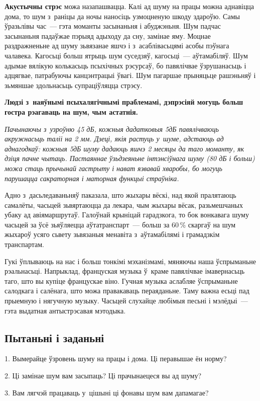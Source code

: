 \textbf{Акустычны стрэс} можа назапашвацца. Калі ад шуму на працы можна аднавіцца дома, то шум з~раніцы да ночы наносіць узмоцненую шкоду здароўю. Самы ўразьлівы час~--- гэта моманты засынаньня і абуджэньня. Шум падчас засынаньня падаўжае пэрыяд адыходу да сну, замінае яму. Моцнае раздражненьне ад шуму зьвязанае яшчэ і з~асаблівасьцямі асобы пэўнага чалавека. Кагосьці больш ятрыць шум суседзяў, кагосьці~--- аўтамабіляў. Шум адымае вялікую колькасьць псыхічных рэсурсаў, бо павялічвае ўзрушанасьць і адцягвае, патрабуючы канцэнтрацыі ўвагі. Шум пагаршае прыняцьце рашэньняў і зьмяншае здольнасьць супраціўляцца стрэсу.

\textbf{Людзі з~наяўнымі псыхалягічнымі праблемамі, дэпрэсіяй могуць больш гостра рэагаваць на шум, чым астатнія.}

\emph{Пачынаючы з~узроўню 45 дБ, кожныя дадатковыя 5дБ павялічваюць акружнасьць таліі на 2 мм. Дзеці, якія растуць у~шуме, адстаюць ад аднагодкаў: кожныя 5дБ шуму дадаюць яшчэ 2 месяцы да таго моманту, як дзіця пачне чытаць. Пастаяннае ўзьдзеяньне інтэнсіўнага шуму (80 дБ і больш) можа стаць прычынай гастрыту і нават язвавай хваробы, бо могуць парушацца сакраторная і маторная функцыі страўніка.}

Адно з~дасьледаваньняў паказала, што жыхары вёскі, над якой пралятаюць самалёты, часьцей зьвяртаюцца да лекара, чым жыхары вёсак, разьмешчаных убаку ад авіямаршрутаў. Галоўнай крыніцай гарадзкога, то бок вонкавага шуму часьцей за ўсё зьяўляецца аўтатранспарт~--- больш за 60\,\% скаргаў на шум жыхароў усяго сьвету зьвязаныя менавіта з~аўтамабілямі і грамадзкім транспартам.

Гукі ўплываюць на нас і больш тонкімі мэханізмамі, мяняючы наша ўспрыманьне рэальнасьці. Напрыклад, француская музыка ў~краме павялічвае імавернасьць таго, што вы купіце францускае віно. Гучная музыка аслабляе ўспрыманьне салодкага і салёнага, што можа правакаваць пераяданьне. Таму важна есьці пад прыемную і нягучную музыку. Часьцей слухайце любімыя песьні і мэлёдыі~--- гэта выдатная антыстрэсавая мэтодыка.

\subsection*{Пытаньні і заданьні}

1. Вымерайце ўзровень шуму на працы і дома. Ці перавышае ён норму?

2. Ці замінае шум вам засыпаць? Ці прачынаецеся вы ад шуму?

3. Вам лягчэй працаваць у~цішыні ці фонавы шум вам дапамагае?


